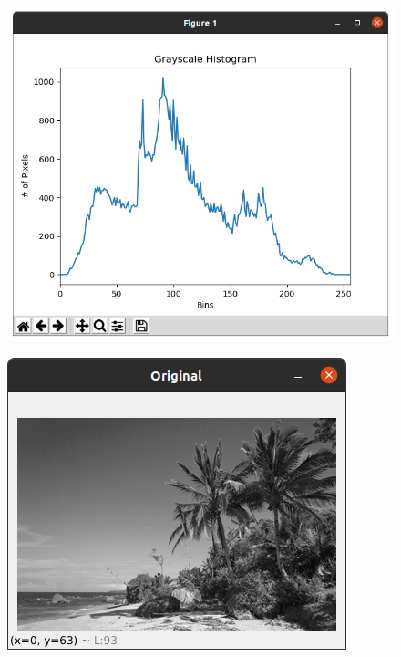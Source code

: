 \documentclass[12pt,letterpaper]{article}
\begin{document}
\begin{multicols}{2}
\begin{figure}[H]
\centering
\includegraphics[width = \columnwidth]{Resultado1_ch7_3.png}
\end{figure} 


\begin{figure}[H]
\centering
\includegraphics[width = \columnwidth]{Resultado2_ch7_3.png}
\end{figure} 



\end{multicols}
\end{document}
